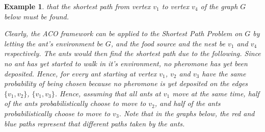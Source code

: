 \documentclass[12pt]{article}
\newtheorem{example}[definition]{Example}
\numberwithin{equation}{subsection}
\numberwithin{table}{subsection}
\numberwithin{algorithm}{subsection}
\numberwithin{figure}{subsection}
\begin{document}
\begin{example}
\label{explain_ACO}
 that the shortest path from vertex $v_1$ to vertex $v_4$ of the graph $G$ below must be found.
\begin{center}
\end{center}
Clearly, the ACO framework can be applied to the Shortest Path Problem on $G$ by letting the ant's environment be $G$, and the food source and the nest be $v_1$ and $v_4$ respectively. The ants would then find the shortest path due to the following. Since no ant has yet started to walk in it's environment, no pheromone has yet been deposited. Hence, for every ant starting at vertex $v_1$, $v_2$ and $v_3$ have the same probability of being chosen because no pheromone is yet deposited on the edges $\{v_1, v_2\}$, $\{v_1, v_3\}$. Hence, assuming that all ants at $v_1$ move at the same time, half of the ants probabilistically choose to move to $v_2$, and half of the ants probabilistically choose to move to $v_3$. Note that in the graphs below, the red and blue paths represent that different paths taken by the ants.
\begin{center}
\end{center}
\end{example}
\end{document}
